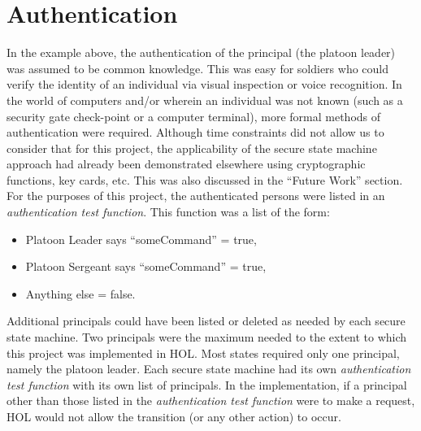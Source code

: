 
\section{Authentication}
\label{sec:authentication}

In the example above, the authentication of the principal (the platoon leader) was
assumed to be common knowledge. This was easy for soldiers who
could verify the identity of an individual via visual inspection or voice recognition.
In the world of computers and/or wherein an individual was not known (such as a
security gate check-point or a computer terminal), more formal methods of authentication
were required. Although time constraints did not allow us to consider that for this
project, the applicability of the secure state machine approach had already been
demonstrated elsewhere using cryptographic functions, key cards, etc. This was also
discussed in the “Future Work” section.\\

For the purposes of this project, the authenticated persons were listed in an \textit{authentication test
function}. This function was a list of the form:
\begin{itemize}
\item Platoon Leader says “someCommand” = true,
\item Platoon Sergeant says “someCommand” = true,
\item Anything else = false.
\end{itemize}

Additional principals could have been listed or deleted as needed by each secure
state machine. Two principals were the maximum needed to the extent to which this
project was implemented in HOL. Most states required only one principal, namely
the platoon leader. Each secure state machine had its own \textit{authentication test
function} with its own list of principals. In the implementation, if a principal
other than those listed in the \textit{authentication test function} were to make a request,
HOL would not allow the transition (or any other action) to occur.\\


